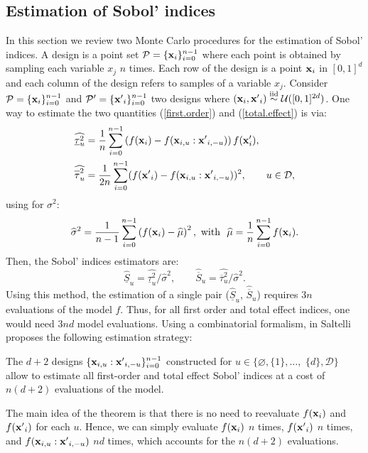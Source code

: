 \subsection{Estimation of Sobol' indices}
\label{sec:2.2}
In this section we review two Monte Carlo procedures for the estimation of Sobol' indices. A design is a point set $\mathcal{P}=\{\boldsymbol{\mathbf{x}}_i\}_{i=0}^{n-1}$ where each point is obtained by sampling each variable $x_j$ $n$ times. Each row of the design is a point $\boldsymbol{\mathbf{x}}_i$ in $[0,1]^d$ and each column of the design refers to samples of a variable $x_j$. Consider $\mathcal{P}=\{\boldsymbol{\mathbf{x}}_i\}_{i=0}^{n-1}$ and $\mathcal{P'}=\{{\boldsymbol{\mathbf{x}}'}_i\}_{i=0}^{n-1}$ two designs where $(\boldsymbol{\mathbf{x}}_i,{\boldsymbol{\mathbf{x}}'}_i) \stackrel{{\rm iid}}{\sim} \mathcal{U}([0,1]^{2d})$. One way to estimate the two quantities (\ref{first.order}) and (\ref{total.effect}) is via:
\begin{align}
\label{first.order.est}
\widehat{\underline{\tau}_u^2} &= \frac{1}{n} \sum \limits_{i=0}^{n-1} \left(f(\vx_i)-f(\vx_{i,u}:{\vx'}_{i,-u})\right)f(\vx'_i),\\
\label{total.effect.est}
\widehat{\ov{$\tau$}_u^2} &= \frac{1}{2n} \sum \limits_{i=0}^{n-1} (f({\vx'}_i) - f(\vx_{i,u}:{\vx'}_{i,-u}))^2, \qquad u \in \mathcal{D},
\end{align}
using for $\sigma^2$:
\begin{equation}
 \widehat{\sigma}^2 = \frac{1}{n-1} \sum \limits_{i=0}^{n-1} \left( f(\boldsymbol{\mathbf{x}}_i) - \widehat{\mu}\right)^2, \text{ with } \ \widehat{\mu} =  \frac{1}{n} \sum \limits_{i=0}^{n-1} f(\boldsymbol{\mathbf{x}}_i).
\label{mu.est}
\end{equation}
Then, the Sobol' indices estimators are:
\begin{equation}
\widehat{\underline{S}}_u = \widehat{\underline{\tau}_u^2} / \widehat{\sigma}^2, \qquad
\widehat{\overline{S}}_u = \widehat{\overline{\tau}_u^2} / \widehat{\sigma}^2.
\label{common.sobol.est}
\end{equation}
Using this method, the estimation of a single pair ($\widehat{\underline{S}}_u$, $\widehat{\overline{S}}_u$) requires $3n$ evaluations of the model $f$. Thus, for all first order and total effect indices, one would need $3nd$ model evaluations. Using a combinatorial formalism, in \cite{Saltelli} Saltelli proposes the following estimation strategy:
\begin{theorem}
\label{saltelli.theorem}
The $d+2$ designs $\{\boldsymbol{\mathbf{x}}_{i,u}:{\boldsymbol{\mathbf{x}}'}_{i,-u}\}_{i=0}^{n-1}$ constructed for $u \in \{\varnothing,\{1\},\dots,$ $\{d\},\mathcal{D}\}$ allow to estimate all first-order and total effect Sobol' indices at a cost of $n(d+2)$ evaluations of the model.
\end{theorem}
The main idea of the theorem is that there is no need to reevaluate $f({\boldsymbol{\mathbf{x}}}_i)$ and $f({\boldsymbol{\mathbf{x}}'}_i)$ for each $u$. Hence, we can simply evaluate $f({\boldsymbol{\mathbf{x}}}_i)$ $n$ times, $f({\boldsymbol{\mathbf{x}}'}_i)$ $n$ times, and $f(\boldsymbol{\mathbf{x}}_{i,u}:{\boldsymbol{\mathbf{x}}'}_{i,-u})$ $nd$ times, which accounts for the $n(d+2)$ evaluations.

